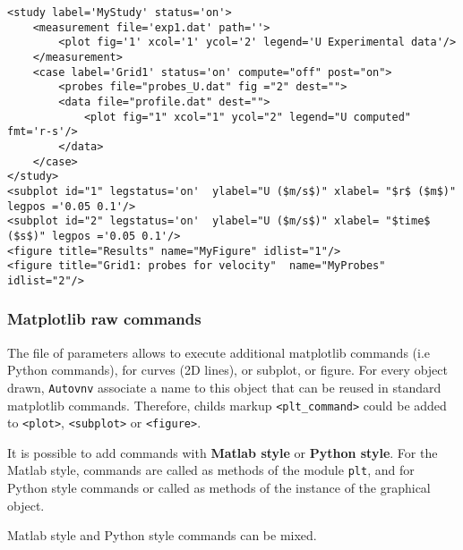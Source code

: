 \documentclass[a4paper,10pt,twoside]{csshortdoc}
\begin{document}
\small
\begin{verbatim}
<study label='MyStudy' status='on'>
    <measurement file='exp1.dat' path=''>
        <plot fig='1' xcol='1' ycol='2' legend='U Experimental data'/>
    </measurement>
    <case label='Grid1' status='on' compute="off" post="on">
        <probes file="probes_U.dat" fig ="2" dest="">
        <data file="profile.dat" dest="">
            <plot fig="1" xcol="1" ycol="2" legend="U computed" fmt='r-s'/>
        </data>
    </case>
</study>
<subplot id="1" legstatus='on'  ylabel="U ($m/s$)" xlabel= "$r$ ($m$)" legpos ='0.05 0.1'/>
<subplot id="2" legstatus='on'  ylabel="U ($m/s$)" xlabel= "$time$ ($s$)" legpos ='0.05 0.1'/>
<figure title="Results" name="MyFigure" idlist="1"/>
<figure title="Grid1: probes for velocity"  name="MyProbes" idlist="2"/>
\end{verbatim}
\normalsize

\subsubsection{Matplotlib raw commands}\label{sec:raw}

The file of parameters allows to execute additional matplotlib commands (i.e
Python commands), for curves (2D lines), or subplot, or figure. For every object
drawn, \texttt{Autovnv} associate a name to this object that can be reused in
standard matplotlib commands. Therefore, childs markup \texttt{<plt\_command>}
could be added to \texttt{<plot>}, \texttt{<subplot>} or \texttt{<figure>}.

It is possible to add commands with \textbf{Matlab style} or \textbf{Python
style}. For the Matlab style, commands are called as methods of the module
\texttt{plt}, and for Python style commands or called as methods of the instance
of the graphical object.

Matlab style and Python style commands can be mixed.
\end{document}
